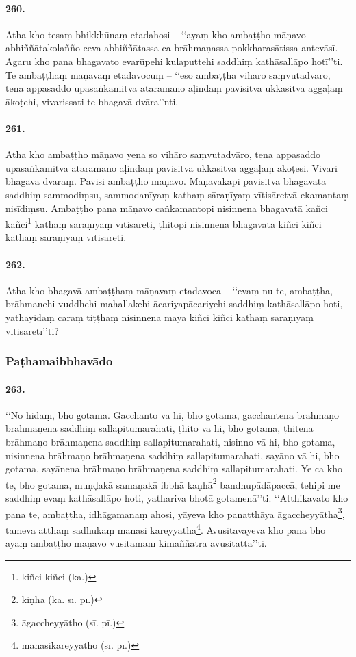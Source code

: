 \paragraph{260.} Atha kho tesaṃ bhikkhūnaṃ etadahosi – ‘‘ayaṃ kho ambaṭṭho māṇavo abhiññātakolañño ceva abhiññātassa ca brāhmaṇassa pokkharasātissa antevāsī. Agaru kho pana bhagavato evarūpehi kulaputtehi saddhiṃ kathāsallāpo hotī’’ti. Te ambaṭṭhaṃ māṇavaṃ etadavocuṃ – ‘‘eso ambaṭṭha vihāro saṃvutadvāro, tena appasaddo upasaṅkamitvā ataramāno āḷindaṃ pavisitvā ukkāsitvā aggaḷaṃ ākoṭehi, vivarissati te bhagavā dvāra’’nti.

\paragraph{261.} Atha kho ambaṭṭho māṇavo yena so vihāro saṃvutadvāro, tena appasaddo upasaṅkamitvā ataramāno āḷindaṃ pavisitvā ukkāsitvā aggaḷaṃ ākoṭesi. Vivari bhagavā dvāraṃ. Pāvisi ambaṭṭho māṇavo. Māṇavakāpi pavisitvā bhagavatā saddhiṃ sammodiṃsu, sammodanīyaṃ kathaṃ sāraṇīyaṃ vītisāretvā ekamantaṃ nisīdiṃsu. Ambaṭṭho pana māṇavo caṅkamantopi nisinnena bhagavatā kañci kañci\footnote{kiñci kiñci (ka.)} kathaṃ sāraṇīyaṃ vītisāreti, ṭhitopi nisinnena bhagavatā kiñci kiñci kathaṃ sāraṇīyaṃ vītisāreti.

\paragraph{262.} Atha kho bhagavā ambaṭṭhaṃ māṇavaṃ etadavoca – ‘‘evaṃ nu te, ambaṭṭha, brāhmaṇehi vuddhehi mahallakehi ācariyapācariyehi saddhiṃ kathāsallāpo hoti, yathayidaṃ caraṃ tiṭṭhaṃ nisinnena mayā kiñci kiñci kathaṃ sāraṇīyaṃ vītisāretī’’ti?

\subsubsection{Paṭhamaibbhavādo}

\paragraph{263.} ‘‘No hidaṃ, bho gotama. Gacchanto vā hi, bho gotama, gacchantena brāhmaṇo brāhmaṇena saddhiṃ sallapitumarahati, ṭhito vā hi, bho gotama, ṭhitena brāhmaṇo brāhmaṇena saddhiṃ sallapitumarahati, nisinno vā hi, bho gotama, nisinnena brāhmaṇo brāhmaṇena saddhiṃ sallapitumarahati, sayāno vā hi, bho gotama, sayānena brāhmaṇo brāhmaṇena saddhiṃ sallapitumarahati. Ye ca kho te, bho gotama, muṇḍakā samaṇakā ibbhā kaṇhā\footnote{kiṇhā (ka. sī. pī.)} bandhupādāpaccā, tehipi me saddhiṃ evaṃ kathāsallāpo hoti, yathariva bhotā gotamenā’’ti. ‘‘Atthikavato kho pana te, ambaṭṭha, idhāgamanaṃ ahosi, yāyeva kho panatthāya āgaccheyyātha\footnote{āgaccheyyātho (sī. pī.)}, tameva atthaṃ sādhukaṃ manasi kareyyātha\footnote{manasikareyyātho (sī. pī.)}. Avusitavāyeva kho pana bho ayaṃ ambaṭṭho māṇavo vusitamānī kimaññatra avusitattā’’ti.

